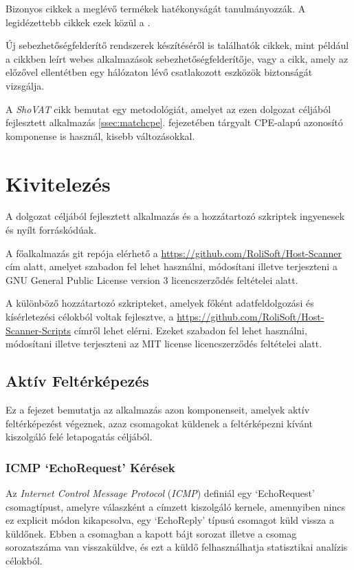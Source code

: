 \documentclass[a4paper,12pt]{article}
\begin{document}
	Bizonyos cikkek a meglévő termékek hatékonyságát tanulmányozzák. A legidézettebb cikkek ezek közül a \cite{holm11,bau10,doupe10}.
	
	Új sebezhetőségfelderítő rendszerek készítéséről is találhatók cikkek, mint például a \cite{kals06} cikkben leírt webes alkalmazások sebezhetőségfelderítője, vagy a \cite{guo05} cikk, amely az előzővel ellentétben egy hálózaton lévő csatlakozott eszközök biztonságát vizsgálja.
	
	A \textit{ShoVAT}\cite{shovat15} cikk bemutat egy metodológiát, amelyet az ezen dolgozat céljából fejlesztett alkalmazás \ref{ssec:matchcpe}. fejezetében tárgyalt CPE-alapú azonosító komponense is használ, kisebb változásokkal.

\section{Kivitelezés} \label{sec:impl}

	A dolgozat céljából fejlesztett alkalmazás és a hozzátartozó szkriptek ingyenesek és nyílt forráskódúak.

	A főalkalmazás git repója elérhető a \url{https://github.com/RoliSoft/Host-Scanner} cím alatt, amelyet szabadon fel lehet használni, módosítani illetve terjeszteni a GNU General Public License version 3\cite{gplv3} licencszerződés feltételei alatt.
	
	A különböző hozzátartozó szkripteket, amelyek főként adatfeldolgozási és kísérletezési célokból voltak fejlesztve, a \url{https://github.com/RoliSoft/Host-Scanner-Scripts} címről lehet elérni. Ezeket szabadon fel lehet használni, módosítani illetve terjeszteni az MIT license\cite{mit} licencszerződés feltételei alatt.

\subsection{Aktív Feltérképezés}

	Ez a fejezet bemutatja az alkalmazás azon komponenseit, amelyek aktív feltérképezést végeznek, azaz csomagokat küldenek a feltérképezni kívánt kiszolgáló felé letapogatás céljából.

\subsubsection{ICMP `EchoRequest' Kérések} \label{ssec:icmpping}

	Az \textit{Internet Control Message Protocol} (\textit{ICMP}) definiál egy `EchoRequest' csomagtípust, amelyre válaszként a címzett kiszolgáló kernele, amennyiben nincs ez explicit módon kikapcsolva, egy `EchoReply' típusú csomagot küld vissza a küldőnek. Ebben a csomagban a kapott bájt sorozat illetve a csomag sorozatszáma van visszaküldve, és ezt a küldő felhasználhatja statisztikai analízis célokból.
\end{document}
